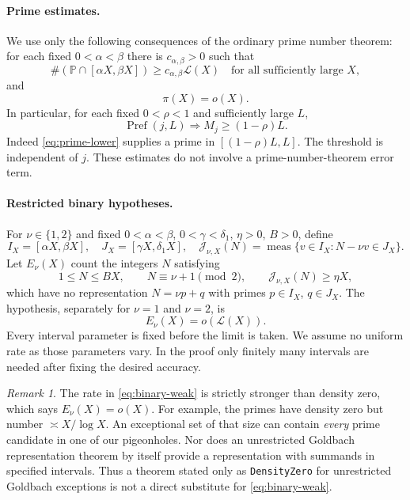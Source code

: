 \documentclass[11pt,letterpaper]{article}
\numberwithin{equation}{section}
\theoremstyle{remark}
\newtheorem{remark}[theorem]{Remark}
\DeclareMathOperator{\meas}{meas}
\newcommand{\Pp}{\mathbb P}
\begin{document}
\paragraph{Prime estimates.}
We use only the following consequences of the ordinary prime number theorem:
for each fixed $0<\alpha<\beta$ there is $c_{\alpha,\beta}>0$ such that
\begin{equation}\label{eq:prime-lower}
 \#(\Pp\cap[\alpha X,\beta X])
 \ge c_{\alpha,\beta}\mathcal L(X)
 \quad\text{for all sufficiently large }X,
\end{equation}
and
\begin{equation}\label{eq:prime-density}
 \pi(X)=o(X).
\end{equation}
In particular, for each fixed $0<\rho<1$ and sufficiently large $L$,
\begin{equation}\label{eq:prefix-max}
 \operatorname{Pref}(j,L)\Longrightarrow
          M_j\ge(1-\rho)L.
\end{equation}
Indeed \eqref{eq:prime-lower} supplies a prime in $[(1-\rho)L,L]$.
The threshold is independent of $j$. These estimates do not involve a
prime-number-theorem error term.

\paragraph{Restricted binary hypotheses.}
For $\nu\in\{1,2\}$ and fixed $0<\alpha<\beta$, $0<\gamma<\delta_1$,
$\eta>0$, $B>0$, define
\[
 I_X=[\alpha X,\beta X],\quad J_X=[\gamma X,\delta_1X],\quad
 \mathcal J_{\nu,X}(N)=\meas\{v\in I_X:N-\nu v\in J_X\}.
\]
Let $E_\nu(X)$ count the integers $N$ satisfying
\[
 1\le N\le BX,\qquad N\equiv\nu+1\pmod2,\qquad
 \mathcal J_{\nu,X}(N)\ge\eta X,
\]
which have no representation $N=\nu p+q$ with primes $p\in I_X$, $q\in J_X$.
The hypothesis, separately for $\nu=1$ and $\nu=2$, is
\begin{equation}\label{eq:binary-weak}
 E_\nu(X)=o(\mathcal L(X)).
\end{equation}
Every interval parameter is fixed before the limit is taken. We assume no
uniform rate as those parameters vary. In the proof only finitely many
intervals are needed after fixing the desired accuracy.

\begin{remark}\label{rem:rate-distinction}
The rate in \eqref{eq:binary-weak} is strictly stronger than density zero,
which says $E_\nu(X)=o(X)$. For example, the primes have density zero but
number $\asymp X/\log X$. An exceptional set of that size can contain
\emph{every} prime candidate in one of our pigeonholes. Nor does an
unrestricted Goldbach representation theorem by itself provide a
representation with summands in specified intervals. Thus a theorem stated
only as \texttt{DensityZero} for unrestricted Goldbach exceptions is not
a direct substitute for \eqref{eq:binary-weak}.
\end{remark}
\end{document}
